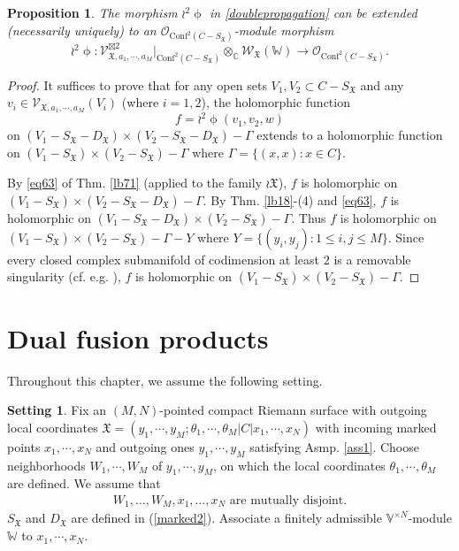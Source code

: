 \documentclass[11pt,b5paper,notitlepage]{article}
\theoremstyle{definition}
\newtheorem{sett}[df]{Setting}
\theoremstyle{plain}
\newtheorem{pp}[df]{Proposition}
\newcommand{\fk}{\mathfrak}
\newcommand{\Conf}{\mathrm{Conf}}
\newcommand{\SV}{\mathscr{V}}
\newcommand{\SX}{{S_{\fk X}}}
\newcommand{\DX}{D_{\fk X}}
\newcommand{\Vbb}{\mathbb V}
\newcommand{\Wbb}{\mathbb W}
\newcommand{\Cbb}{\mathbb C}
\newcommand{\<}{\left\langle}
\renewcommand{\>}{\right\rangle}
\newcommand{\MO}{\mathcal{O}}
\newcommand{\fx}{\mathfrak{X}}
\newcommand{\SW}{\mathscr{W}}
\numberwithin{equation}{section}
\begin{document}
\begin{pp}\label{anotherversionpropagation2}
The morphism $\wr^2\upphi$ in \eqref{doublepropagation} can be extended (necessarily uniquely) to an  $\MO_{\Conf^2(C-S_\fx)}$-module morphism
\begin{equation}\label{doublepropagation2}
\wr^2\upphi:\SV_{\fx,a_1,\cdots,a_M}^{\boxtimes 2}\vert_{\Conf^2(C-S_\fx)}\otimes_\Cbb \SW_\fx(\Wbb)\rightarrow \MO_{\Conf^2(C-S_\fx)}.
\end{equation}
\end{pp}
\begin{proof}
It suffices to prove that for any open sets $V_1,V_2\subset C-S_\fx$ and any  $v_i\in \SV_{\fx,a_1,\cdots,a_M}(V_i)$ (where $i=1,2$), the holomorphic function
\begin{equation}\label{proofdoublepropagation2}
f=\wr^2\upphi(v_1,v_2,w)
\end{equation}
on $(V_1-\SX-\DX)\times(V_2-\SX-\DX)-\Gamma$ extends to a holomorphic function on $(V_1-\SX)\times(V_2-\SX)-\Gamma$ where $\Gamma=\{(x,x):x\in C\}$. 

By \eqref{eq63} of Thm. \ref{lb71} (applied to the family $\wr\fk X$), $f$ is holomorphic on $(V_1-\SX)\times(V_2-\SX-\DX)-\Gamma$. By Thm. \ref{lb18}-(4) and \eqref{eq63}, $f$ is holomorphic on $(V_1-\SX-\DX)\times (V_2-\SX)-\Gamma$. Thus $f$ is holomorphic on $(V_1-\SX)\times(V_2-\SX)-\Gamma-Y$ where $Y=\{(y_i,y_j):1\leq i,j\leq M\}$. Since every closed complex submanifold of codimension at least $2$ is a removable singularity   (cf. e.g. \cite[Thm. 7.1.2]{GR84}), $f$ is holomorphic on $(V_1-\SX)\times(V_2-\SX)-\Gamma$.
\end{proof}















\section{Dual fusion products}
\label{Ch3}

Throughout this chapter, we assume the following setting.


\begin{sett}\label{lb24}
Fix an $(M,N)$-pointed compact Riemann surface with outgoing local coordinates $\fx=(y_1,\cdots,y_M;\theta_1,\cdots,\theta_M\big|C\big|x_1,\cdots,x_N)$ with incoming marked points $x_1,\cdots,x_N$ and outgoing ones $y_1,\cdots,y_M$ satisfying Asmp. \ref{ass1}.  Choose neighborhoods $W_1,\cdots,W_M$ of $y_1,\cdots,y_M$, on which the local coordinates $\theta_1,\cdots,\theta_M$ are defined. We assume that
\begin{align}
W_1,\dots,W_M,x_1,\dots,x_N\text{ are mutually disjoint}.
\end{align}
$S_\fx$ and $D_\fx$ are defined in (\ref{marked2}). Associate a finitely admissible $\Vbb^{\times N}$-module $\Wbb$ to $x_1,\cdots,x_N$.
\end{sett}
\end{document}

